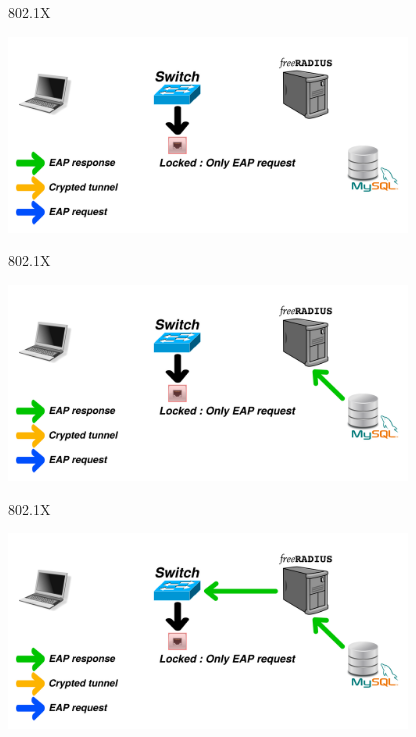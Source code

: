 \documentclass[12pt]{beamer}
\begin{document}
\begin{frame}[noframenumbering]{802.1X}
\vfill
\begin{center}
    \includegraphics[width=300pt]{img/dot1x_1.pdf}
    \addtocounter{framenumber}{-1}
\end{center}
\vfill
\end{frame}

\begin{frame}[noframenumbering]{802.1X}
\vfill
\begin{center}
    \includegraphics[width=300pt]{img/dot1x_5.pdf}
    \addtocounter{framenumber}{-1}
\end{center}
\vfill
\end{frame}

\begin{frame}[noframenumbering]{802.1X}
\vfill
\begin{center}
    \includegraphics[width=300pt]{img/dot1x_6.pdf}
    \addtocounter{framenumber}{-1}
\end{center}
\vfill
\end{frame}
\end{document}
